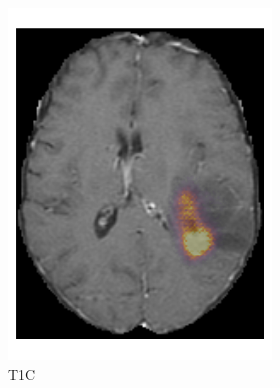 \begin{figure}[htbp]
\begin{subfigure}[b]{\textwidth}
\begin{subfigure}[b]{0.24\textwidth}
        \includegraphics[width=\textwidth]{Figures/saliency_LGG_T1GD.png}
        \caption*{\acrshort{T1C}\nopunct}
        \end{subfigure}
        \hfill
        \begin{subfigure}[b]{0.24\textwidth}

\end{subfigure}
\end{subfigure}
\end{figure}
